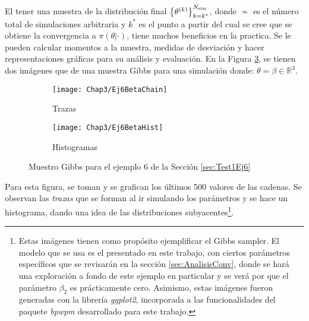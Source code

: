 \documentclass[../Main/Main.tex]{subfiles}
\begin{document}
El tener una muestra de la distribución final $\left\{\theta^{(k)}\right\}_{k=k^*}^{N_{\text{sim}}}$, donde $\nsim$ es el número total de simulaciones arbitraria y $k^*$ es el punto a partir del cual se cree que se obtiene la convergencia a $\pi(\theta|\cdot)$, tiene muchos beneficios en la practica. Se le pueden calcular momentos a la muestra, medidas de desviación y hacer representaciones gráficas para su análisis y evaluación. En la Figura \ref{fig:GibbsSamplerSimulado}, se tienen dos imágenes que de una muestra Gibbs para una simulación donde: $\theta = \beta \in \mathbb{R}^3$. 
\begin{figure}[h]
    \centering
    \begin{subfigure}[b]{0.45\textwidth}
        \texttt{[image: Chap3/Ej6BetaChain]}
        \caption{Trazas}
        \label{fig:GibbsChain}
    \end{subfigure}
	\quad
    \begin{subfigure}[b]{0.45\textwidth}
        \texttt{[image: Chap3/Ej6BetaHist]}
        \caption{Histogramas}
        \label{fig:GibbsHist}
    \end{subfigure}
    \caption{Muestro Gibbs para el ejemplo 6 de la Sección \ref{sec:Test1Ej6}}\label{fig:GibbsSamplerSimulado}
\end{figure}
Para esta figura, se toman y se grafican los últimos 500 valores de las cadenas. Se observan las \textit{trazas} que se forman al ir simulando los parámetros y se hace un histograma, dando una idea de las distribuciones subyacentes\footnote{Estas imágenes tienen como propósito ejemplificar el Gibbs sampler. El modelo que se usa es el presentado en este trabajo, con ciertos parámetros específicos que se revisarán en la sección \ref{sec:AnalisisConv}, donde se hará una exploración a fondo de este ejemplo en particular y se verá por que el parámetro $\beta_2$ es prácticamente cero. Asimismo, estas imágenes fueron generadas con la librería \textit{ggplot2}, incorporada a las funcionalidades del paquete \textit{bpwpm} desarrollado para este trabajo.}.
\end{document}
